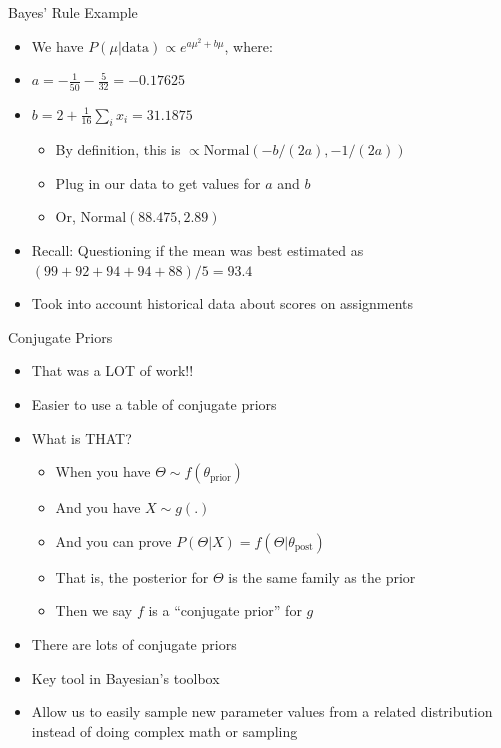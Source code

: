 \documentclass[aspectratio=169]{beamer}
\begin{document}
\begin{frame}{Bayes' Rule Example}
\begin{itemize} 
	\item We have $P(\mu | \textrm{data}) \propto e^{a \mu^2 + b \mu}$, where:
	\item $a = -\frac{1}{50} -\frac{5}{32} = -0.17625$
	\item $b = 2 + \frac{1}{16} \sum_i x_i = 31.1875$
	\begin{itemize}
		\item By definition, this is $\propto \textrm{Normal}(-b/(2a), -1/(2a))$
		\item Plug in our data to get values for $a$ and $b$
		\item Or, $\textrm{Normal}(88.475, 2.89)$
	\end{itemize}
	\item Recall: Questioning if the mean was best estimated as $(99 + 92 + 94 + 94 + 88) / 5 = 93.4$
	\item Took into account historical data about scores on assignments 
\end{itemize}
	\end{frame}

\begin{frame}{Conjugate Priors}

\begin{itemize} 
	\item That was a LOT of work!!
	\item Easier to use a table of conjugate priors
	\item What is THAT?
	\begin{itemize}
		\item When you have $\Theta \sim f(\theta_{\textrm{prior}})$
		\item And you have $X \sim g(.)$
		\item And you can prove $P(\Theta | X) = f (\Theta | \theta_{\textrm{post}})$
		\item That is, the posterior for $\Theta$ is the same family as the prior
		\item Then we say $f$ is a ``conjugate prior'' for $g$
	\end{itemize}
	\item There are lots of conjugate priors
	\item Key tool in Bayesian's toolbox
	\item Allow us to easily sample new parameter values from a related distribution instead of doing complex math or sampling
\end{itemize}
\end{frame}
\end{document}
